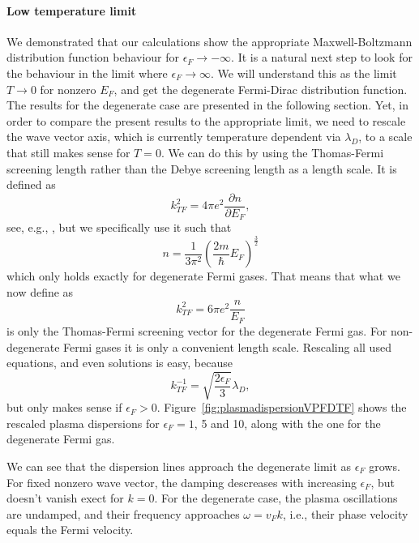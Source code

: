 \documentclass[physics,phd,nolot,nolof]{uccthesis}%
\begin{document}
\paragraph*{Low temperature limit}
We demonstrated that our calculations show the appropriate Maxwell-Boltzmann distribution function behaviour for $\epsilon_F\to-\infty$. 
It is a natural next step to look for the behaviour in the limit where $\epsilon_F\to\infty$. 
We will understand this as the limit $T\to0$ for nonzero $E_F$, and get the degenerate Fermi-Dirac distribution function.
The results for the degenerate case are presented in the following section.
Yet, in order to compare the present results to the appropriate limit, we need to rescale the wave vector axis, which is currently temperature dependent via $\lambda_D$, to a scale that still makes sense for $T=0$. 
We can do this by using the Thomas-Fermi screening length rather than the Debye screening length as a length scale. 
It is defined as
\begin{equation}
	k_{TF}^2=4\pi e^2\frac{\partial n}{\partial E_F},
	\label{eq:KTF}
\end{equation}
see, e.g., \cite{asc87}, but we specifically use it such that
\begin{equation}
	n=\frac{1}{3\pi^2}(\frac{2m}{\hbar}E_F)^\frac{3}{2}
	\label{eq:ndegenerateFermi}
\end{equation}
which only holds exactly for degenerate Fermi gases. 
That means that what we now define as 
\begin{equation}
	k_{TF}^2=6\pi e^2 \frac{n}{E_F}
	\label{eq:Ktf}
\end{equation}
is only the Thomas-Fermi screening vector for the degenerate Fermi gas. 
For non-degenerate Fermi gases it is only a convenient length scale.
Rescaling all used equations, and even solutions is easy, because
\begin{equation}
	k_{TF}^{-1}=\sqrt{\frac{2\epsilon_F}{3}}\lambda_D,
	\label{eq:thomasfermidebye}
\end{equation}
but only makes sense if $\epsilon_F>0$.
Figure~\ref{fig:plasmadispersionVPFDTF} shows the rescaled plasma dispersions for $\epsilon_F=1$, 5 and 10, along with the one for the degenerate Fermi gas.

We can see that the dispersion lines approach the degenerate limit as $\epsilon_F$ grows.
For fixed nonzero wave vector, the damping descreases with increasing  $\epsilon_F$, but doesn't vanish exect for $k=0$.
For the degenerate case, the plasma oscillations are undamped, and their frequency approaches $\omega=v_Fk$, i.e., their phase velocity equals the Fermi velocity. 
\end{document}
